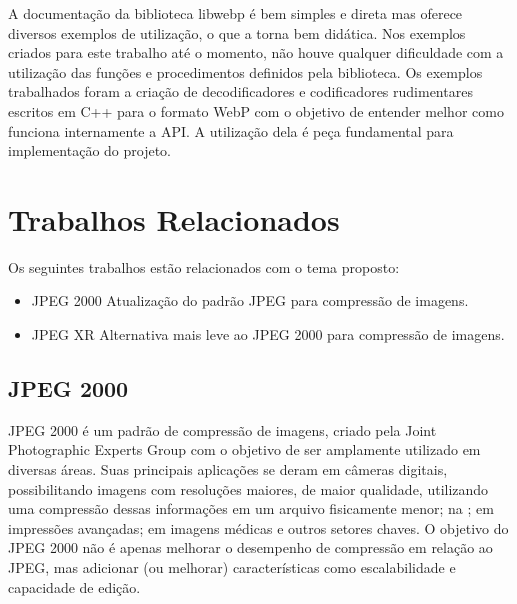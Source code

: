 \documentclass[espaco=simples,appendix=Name]{abnt}
\begin{document}
A documentação da biblioteca libwebp é bem simples e direta mas oferece diversos exemplos de utilização, o que a torna bem didática. Nos exemplos criados para este trabalho até o momento, não houve qualquer dificuldade com a utilização das funções e procedimentos definidos pela biblioteca. Os exemplos trabalhados foram a criação de decodificadores e codificadores rudimentares escritos em C++ para o formato WebP com o objetivo de entender melhor como funciona internamente a API. A utilização dela é peça fundamental para implementação do projeto.



\chapter{Trabalhos Relacionados}

Os seguintes trabalhos estão relacionados com o tema proposto:

\begin{itemize}
	\item JPEG 2000 Atualização do padrão JPEG para compressão de imagens.
	\item JPEG XR Alternativa mais leve ao JPEG 2000 para compressão de imagens.
\end{itemize}


\section{JPEG 2000}

JPEG 2000 é um padrão de compressão de imagens, criado pela Joint Photographic Experts Group com o objetivo de ser amplamente utilizado em diversas áreas. Suas principais aplicações se deram em câmeras digitais, possibilitando imagens com resoluções maiores, de maior qualidade, utilizando uma compressão dessas informações em um arquivo fisicamente menor; na ; em impressões avançadas; em imagens médicas e outros setores chaves. O objetivo do JPEG 2000 não é apenas melhorar o desempenho de compressão em relação ao JPEG, mas adicionar (ou melhorar) características como escalabilidade e capacidade de edição.
\end{document}
